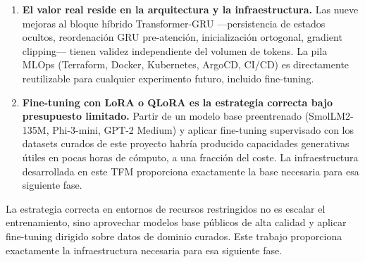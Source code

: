 \begin{enumerate}
    \item \textbf{El valor real reside en la arquitectura y la infraestructura.} Las nueve mejoras al bloque híbrido Transformer-GRU ---persistencia de estados ocultos, reordenación GRU pre-atención, inicialización ortogonal, gradient clipping--- tienen validez independiente del volumen de tokens. La pila MLOps (Terraform, Docker, Kubernetes, ArgoCD, CI/CD) es directamente reutilizable para cualquier experimento futuro, incluido fine-tuning.

    \item \textbf{Fine-tuning con LoRA o QLoRA es la estrategia correcta bajo presupuesto limitado.} Partir de un modelo base preentrenado (SmolLM2-135M, Phi-3-mini, GPT-2 Medium) y aplicar fine-tuning supervisado con los datasets curados de este proyecto habría producido capacidades generativas útiles en pocas horas de cómputo, a una fracción del coste. La infraestructura desarrollada en este TFM proporciona exactamente la base necesaria para esa siguiente fase.
\end{enumerate}

La estrategia correcta en entornos de recursos restringidos no es escalar el entrenamiento, sino aprovechar modelos base públicos de alta calidad y aplicar fine-tuning dirigido sobre datos de dominio curados. Este trabajo proporciona exactamente la infraestructura necesaria para esa siguiente fase.

